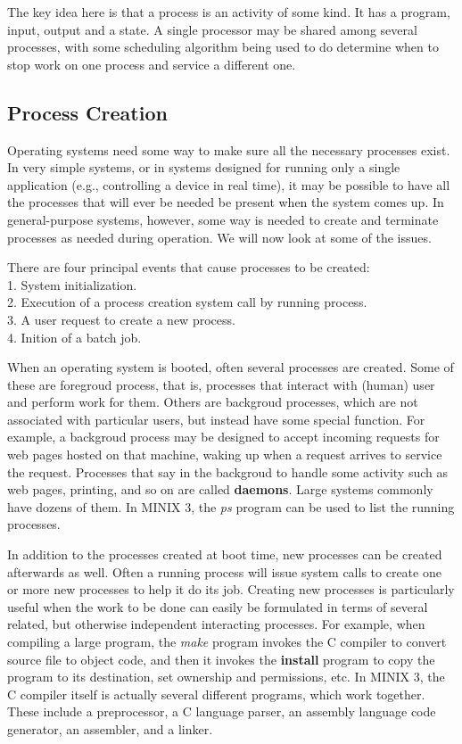 \documentclass{book}
\newcommand {\kw}  [1] {\textbf{#1}}
\newcommand {\sys} [1] {\textsl{#1}}
\begin{document}
The key idea here is that a process is an activity of some kind.
It has a program, input, output and a state.
A single processor may be shared among several processes, with some scheduling algorithm being used to do determine
when to stop work on one process and service a different one.

\subsection{Process Creation}
Operating systems need some way to make sure all the necessary processes exist.
In very simple systems, or in systems designed for running only a single application (e.g., controlling a device in real time),
it may be possible to have all the processes that will ever be needed be present when the system comes up.
In general-purpose systems, however, some way is needed to create and terminate processes as needed during operation.
We will now look at some of the issues.

There are four principal events that cause processes to be created:\\
1. System initialization.\\
2. Execution of a process creation system call by running process.\\ 
3. A user request to create a new process.\\
4. Inition of a batch job.

When an operating system is booted, often several processes are created.
Some of these are foregroud process, that is, processes that interact with (human) user and perform work for them.
Others are backgroud processes, which are not associated with particular users, but instead have some special function.
For example, a backgroud process may be designed to accept incoming requests for web pages hosted on that machine,
waking up when a request arrives to service the request.
Processes that say in the backgroud to handle some activity such as web pages, printing, and so on are called \kw{daemons}.
Large systems commonly have dozens of them.
In MINIX 3, the \sys{ps} program can be used to list the running processes.

In addition to the processes created at boot time, new processes can be created afterwards as well.
Often a running process will issue system calls to create one or more new processes to help it do its job.
Creating new processes is particularly useful when the work to be done can easily be formulated in terms of several related,
but otherwise independent interacting processes.
For example, when compiling a large program, the \sys{make} program invokes the C compiler to convert source file to object code,
and then it invokes the \kw{install} program to copy the program to its destination, 
set ownership and permissions, etc.
In MINIX 3, the C compiler itself is actually several different programs, which work together.
These include a preprocessor, a C language parser, an assembly language code generator, an assembler, and a linker.
\end{document}
